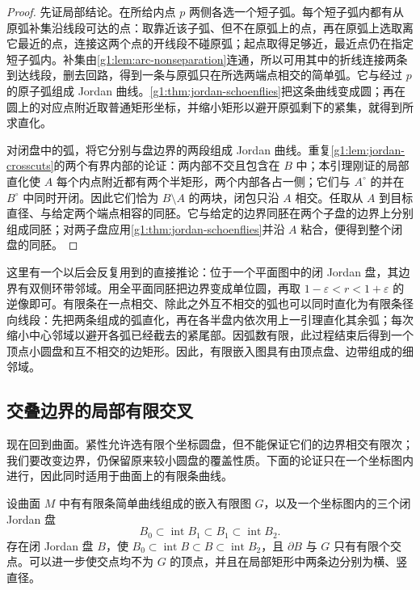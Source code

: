 \begin{proof}
	先证局部结论。在所给内点 \(p\) 两侧各选一个短子弧。每个短子弧内都有从原弧补集沿线段可达的点：取靠近该子弧、但不在原弧上的点，再在原弧上选取离它最近的点，连接这两个点的开线段不碰原弧；起点取得足够近，最近点仍在指定短子弧内。补集由\cref{g1:lem:arc-nonseparation}连通，所以可用其中的折线连接两条到达线段，删去回路，得到一条与原弧只在所选两端点相交的简单弧。它与经过 \(p\) 的原子弧组成 Jordan 曲线。\cref{g1:thm:jordan-schoenflies}把这条曲线变成圆；再在圆上的对应点附近取普通矩形坐标，并缩小矩形以避开原弧剩下的紧集，就得到所求直化。

	对闭盘中的弧，将它分别与盘边界的两段组成 Jordan 曲线。重复\cref{g1:lem:jordan-crosscuts}的两个有界内部的论证：两内部不交且包含在 \(B\) 中；本引理刚证的局部直化使 \(A\) 每个内点附近都有两个半矩形，两个内部各占一侧；它们与 \(A^\circ\) 的并在 \(B^\circ\) 中同时开闭。因此它们恰为 \(B\setminus A\) 的两块，闭包只沿 \(A\) 相交。任取从 \(A\) 到目标直径、与给定两个端点相容的同胚。它与给定的边界同胚在两个子盘的边界上分别组成同胚；对两子盘应用\cref{g1:thm:jordan-schoenflies}并沿 \(A\) 粘合，便得到整个闭盘的同胚。
\end{proof}

这里有一个以后会反复用到的直接推论：位于一个平面图中的闭 Jordan 盘，其边界有双侧环带邻域。用全平面同胚把边界变成单位圆，再取 \(1-\varepsilon<r<1+\varepsilon\) 的逆像即可。有限条在一点相交、除此之外互不相交的弧也可以同时直化为有限条径向线段：先把两条组成的弧直化，再在各半盘内依次用上一引理直化其余弧；每次缩小中心邻域以避开各弧已经截去的紧尾部。因弧数有限，此过程结束后得到一个顶点小圆盘和互不相交的边矩形。因此，有限嵌入图具有由顶点盘、边带组成的细邻域。

\subsection{交叠边界的局部有限交叉}
\label{g1:subsec:0602:02}

现在回到曲面。紧性允许选有限个坐标圆盘，但不能保证它们的边界相交有限次；我们要改变边界，仍保留原来较小圆盘的覆盖性质。下面的论证只在一个坐标图内进行，因此同时适用于曲面上的有限条曲线。

\begin{lemma}\label{g1:lem:disk-boundary-regularization}
	设曲面 \(M\) 中有有限条简单曲线组成的嵌入有限图 \(G\)，以及一个坐标图内的三个闭 Jordan 盘
	\[
		B_0\subset\operatorname{int}B_1\subset B_1\subset\operatorname{int}B_2.
	\]
	存在闭 Jordan 盘 \(B\)，使 \(B_0\subset\operatorname{int}B\subset B\subset\operatorname{int}B_2\)，且 \(\partial B\) 与 \(G\) 只有有限个交点。可以进一步使交点均不为 \(G\) 的顶点，并且在局部矩形中两条边分别为横、竖直径。
\end{lemma}

